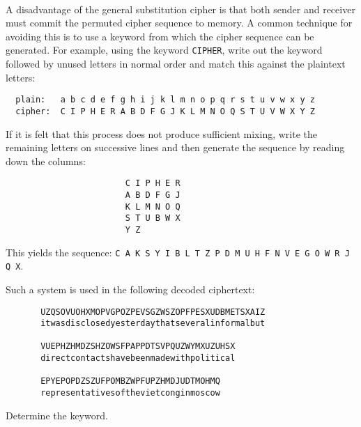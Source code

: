 \documentclass[11pt]{amsart}
\newcounter{problem}
\newenvironment{problem}[1][]%
{%
\stepcounter{problem} \vspace{.2cm} \noindent {\bf \arabic{problem}.} {\it #1}~ %
}{%
\vspace{.2cm}%
}
\begin{document}
\thispagestyle{empty}

\title{} 



\bigskip


\begin{problem}
A disadvantage of the general substitution cipher is that both sender and receiver must commit the permuted cipher sequence to memory.  A common technique for avoiding this is to use a keyword from which the cipher sequence can be generated.  For example, using the keyword \texttt{CIPHER}, write out the keyword followed by unused letters in normal order and match this against the plaintext letters:

\begin{verbatim}
  plain:   a b c d e f g h i j k l m n o p q r s t u v w x y z
  cipher:  C I P H E R A B D F G J K L M N O Q S T U V W X Y Z
\end{verbatim}

If it is felt that this process does not produce sufficient mixing, write the remaining letters on successive lines and then generate the sequence by reading down the columns:

\begin{verbatim}
                        C I P H E R
                        A B D F G J
                        K L M N O Q
                        S T U B W X
                        Y Z
\end{verbatim}

This yields the sequence: \verb|C A K S Y I B L T Z P D M U H F N V E G O W R J Q X|.

Such a system is used in the following decoded ciphertext: 

\begin{verbatim}
       UZQSOVUOHXMOPVGPOZPEVSGZWSZOPFPESXUDBMETSXAIZ
       itwasdisclosedyesterdaythatseveralinformalbut

       VUEPHZHMDZSHZOWSFPAPPDTSVPQUZWYMXUZUHSX
       directcontactshavebeenmadewithpolitical

       EPYEPOPDZSZUFPOMBZWPFUPZHMDJUDTMOHMQ
       representativesofthevietconginmoscow
\end{verbatim}

Determine the keyword.

\end{problem}
\end{document}
